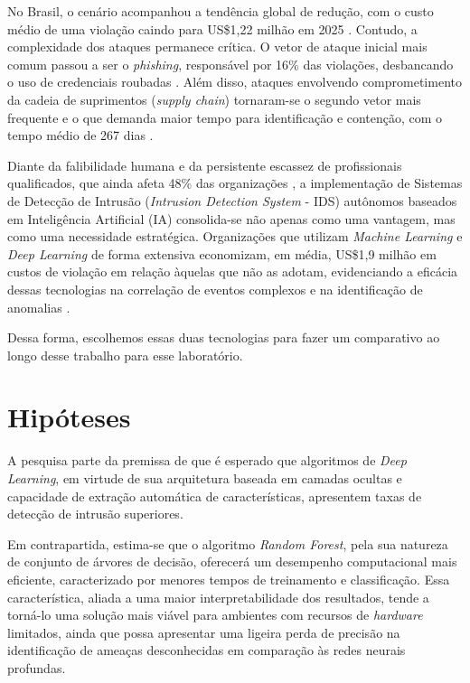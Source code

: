No Brasil, o cenário acompanhou a tendência global de redução, com o custo médio de uma violação caindo para US\$1,22 milhão em 2025 \parencite[6]{IBM2025}. Contudo, a complexidade dos ataques permanece crítica. O vetor de ataque inicial mais comum passou a ser o \textit{phishing}, responsável por 16\% das violações, desbancando o uso de credenciais roubadas \parencite[16]{IBM2025}. Além disso, ataques envolvendo comprometimento da cadeia de suprimentos (\textit{supply chain}) tornaram-se o segundo vetor mais frequente e o que demanda maior tempo para identificação e contenção, com o tempo médio de 267 dias \parencite[18]{IBM2025}.

Diante da falibilidade humana e da persistente escassez de profissionais qualificados, que ainda afeta 48\% das organizações \parencite[44]{IBM2025}, a implementação de Sistemas de Detecção de Intrusão (\textit{Intrusion Detection System} - IDS) autônomos baseados em Inteligência Artificial (IA) consolida-se não apenas como uma vantagem, mas como uma necessidade estratégica. Organizações que utilizam \textit{Machine Learning} e \textit{Deep Learning} de forma extensiva economizam, em média, US\$1,9 milhão em custos de violação em relação àquelas que não as adotam, evidenciando a eficácia dessas tecnologias na correlação de eventos complexos e na identificação de anomalias \parencite[4]{IBM2025}.

Dessa forma, escolhemos essas duas tecnologias para fazer um comparativo ao longo desse trabalho para esse laboratório.

\section{Hipóteses}

A pesquisa parte da premissa de que é esperado que algoritmos de \textit{Deep Learning}, em virtude de sua arquitetura baseada em camadas ocultas e capacidade de extração automática de características, apresentem taxas de detecção de intrusão superiores.

Em contrapartida, estima-se que o algoritmo \textit{Random Forest}, pela sua natureza de conjunto de árvores de decisão, oferecerá um desempenho computacional mais eficiente, caracterizado por menores tempos de treinamento e classificação. Essa característica, aliada a uma maior interpretabilidade dos resultados, tende a torná-lo uma solução mais viável para ambientes com recursos de \textit{hardware} limitados, ainda que possa apresentar uma ligeira perda de precisão na identificação de ameaças desconhecidas em comparação às redes neurais profundas.

